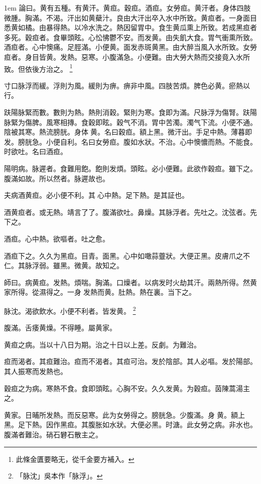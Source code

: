 \hangindent 1em
論曰。黄有五種。有黄汗。黄疸。穀疸。酒疸。女勞疸。黄汗者。身体四肢微腫。胸滿。不渴。汗出如黄蘗汁。良由大汗出卒入水中所致。黄疸者。一身面目悉黄如橘。由暴得熱。以冷水洗之。熱因留胃中。食生黄瓜熏上所致。若成黑疸者多死。穀疸者。食畢頭眩。心忪怫鬱不安。而发黄。由失飢大食。胃气衝熏所致。酒疸者。心中懊痛。足脛滿。小便黄。面发赤斑黄黑。由大醉当風入水所致。女勞疸者。身目皆黄。发熱。惡寒。小腹滿急。小便難。由大勞大熱而交接竟入水所致。但依後方治之。{\qianjin}
	\footnote{
		此條金匱要略无，從千金要方補入。
	}

寸口脉浮而緩。浮則为風。緩則为痹。痹非中風。四肢苦煩。脾色必黄。瘀熱以行。

趺陽脉緊而數。數則为熱。熱則消穀。緊則为寒。食即为滿。尺脉浮为傷腎。趺陽脉緊为傷脾。風寒相摶。食穀即眩。穀气不消。胃中苦濁。濁气下流。小便不通。陰被其寒。熱流膀胱。身体{\sungtpii 𥁞}黄。名曰穀疸。額上黑。微汗出。手足中熱。薄暮即发。膀胱急。小便自利。名曰女勞疸。腹如水狀。不治。心中懊憹而熱。不能食。时欲吐。名曰酒疸。

陽明病。脉遲者。食難用飽。飽則发煩。頭眩。必小便難。此欲作穀疸。雖下之。腹滿如故。所以然者。脉遲故也。

夫病酒黄疸。必小便不利。其{\sungtpii 𠊱}心中熱。足下熱。是其証也。

酒黄疸者。或无熱。靖言了{\khaaitp 了}。腹滿欲吐。鼻燥。其脉浮者。先吐之。沈弦者。先下之。

酒疸。心中熱。欲嘔者。吐之愈。

酒疸下之。久久为黑疸。目青。面黑。心中如噉蒜虀狀。大便正黑。皮膚爪之不仁。其脉浮弱。雖黑。微黄。故知之。

師曰。病黄疸。发熱。煩喘。胸滿。口燥者。以病发时火劫其汗。兩熱所得。然黄家所得。從濕得之。一身{\sungtpii 𥁞}发熱而黄。肚熱。熱在裏。当下之。

脉沈。渴欲飲水。小便不利者。皆发黄。
	\footnote{
		「脉沈」吳本作「脉浮」。
	}

腹滿。舌痿黄燥。不得睡。屬黄家。

黄疸之病。当以十八日为期。治之十日以上差。反劇。为難治。

疸而渴者。其疸難治。疸而不渴者。其疸可治。发於陰部。其人必嘔。{\khaaitp 发於}陽部。其人振寒而发熱也。

穀疸之为病。寒熱不食。食即頭眩。心胸不安。久久发黄。为穀疸。茵陳蒿湯主之。

黄家。日晡所发熱。而反惡寒。此为女勞得之。膀胱急。少腹滿。身{\sungtpii 𥁞}黄。額上黑。足下熱。因作黑疸。其腹胀如水狀。大便必黑。时溏。此女勞之病。非水也。腹滿者難治。硝石礬石散主之。

